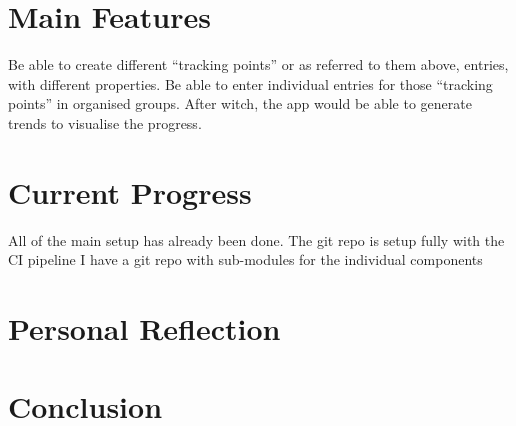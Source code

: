 \documentclass[11pt]{article}
\begin{document}
\section{Main Features}

Be able to create different ``tracking points'' or as referred to them above, entries, with different properties. Be able to enter individual entries for those ``tracking points'' in organised groups. After witch, the app would be able to generate trends to visualise the progress. \par

\section{Current Progress}
All of the main setup has already been done. The git repo is setup fully with the CI pipeline 
I have a git repo with sub-modules for the individual components

\section{Personal Reflection}

\section{Conclusion}
\end{document}

